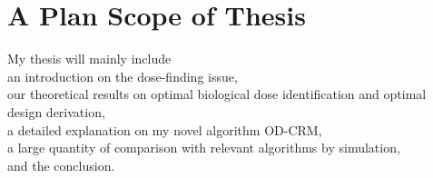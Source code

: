\documentclass[12pt]{article}
\begin{document}
\section{A Plan Scope of Thesis}
My thesis will mainly include\\
an introduction on the dose-finding issue,\\
our theoretical results on optimal biological dose identification and optimal design derivation,\\
a detailed explanation on my novel algorithm OD-CRM,\\
a large quantity of comparison with relevant algorithms by simulation,\\
and the conclusion.\\

\nocite{*}


\end{document}
